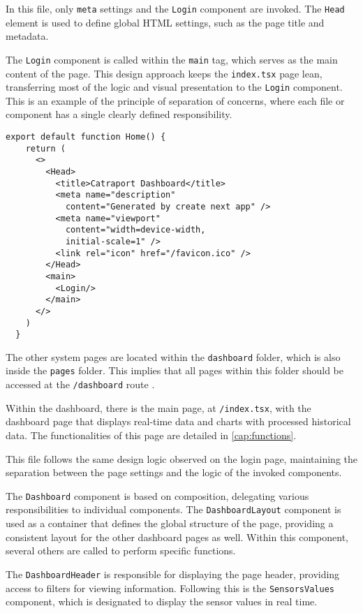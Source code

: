 In this file, only \texttt{meta} settings and the \texttt{Login} component are invoked. The \texttt{Head} element \cite{nextjsHeadComponent} is used to define global HTML settings, such as the page title and metadata.

The \texttt{Login} component is called within the \texttt{main} tag, which serves as the main content of the page. This design approach keeps the \texttt{index.tsx} page lean, transferring most of the logic and visual presentation to the \texttt{Login} component. This is an example of the principle of separation of concerns, where each file or component has a single clearly defined responsibility.

\begin{verbatim}
export default function Home() {
    return (
      <>
        <Head>
          <title>Catraport Dashboard</title>
          <meta name="description" 
            content="Generated by create next app" />
          <meta name="viewport" 
            content="width=device-width,
            initial-scale=1" />
          <link rel="icon" href="/favicon.ico" />
        </Head>
        <main>
          <Login/>
        </main>
      </>
    )
  }
\end{verbatim}

The other system pages are located within the \texttt{dashboard} folder, which is also inside the \texttt{pages} folder. This implies that all pages within this folder should be accessed at the \texttt{/dashboard} route \cite{nextjsDefiningRoutes}.

Within the dashboard, there is the main page, at \texttt{/index.tsx}, with the dashboard page that displays real-time data and charts with processed historical data. The functionalities of this page are detailed in \ref{cap:functions}.

This file follows the same design logic observed on the login page, maintaining the separation between the page settings and the logic of the invoked components.

The \texttt{Dashboard} component is based on composition, delegating various responsibilities to individual components. The \texttt{DashboardLayout} component is used as a container that defines the global structure of the page, providing a consistent layout for the other dashboard pages as well. Within this component, several others are called to perform specific functions.

The \texttt{DashboardHeader} is responsible for displaying the page header, providing access to filters for viewing information. Following this is the \texttt{SensorsValues} component, which is designated to display the sensor values in real time.

